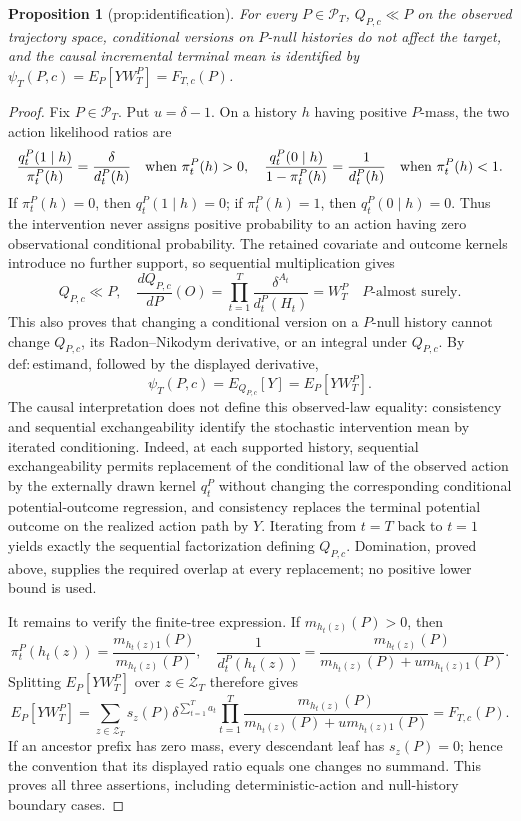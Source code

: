 \documentclass{article}
\newtheorem{proposition}{Proposition}
\begin{document}
\begin{proposition}[prop:identification]\label{prop:identification}
For every \(P\in\mathcal P_T\), \(Q_{P,c}\ll P\) on the observed trajectory space, conditional versions on \(P\)-null histories do not affect the target, and the causal incremental terminal mean is identified by \(\psi_T(P,c)=E_P[YW_T^P]=F_{T,c}(P)\).
\end{proposition}
\begin{proof}
Fix \(P\in\mathcal P_T\).  Put \(u=\delta-1\).  On a history \(h\) having positive \(P\)-mass, the two action likelihood ratios are
\[
 \frac{q_t^P(1\mid h)}{\pi_t^P(h)}=\frac{\delta}{d_t^P(h)}
 \quad\hbox{when }\pi_t^P(h)>0,
 \quad
 \frac{q_t^P(0\mid h)}{1-\pi_t^P(h)}=\frac{1}{d_t^P(h)}
 \quad\hbox{when }\pi_t^P(h)<1.
\]
If \(\pi_t^P(h)=0\), then \(q_t^P(1\mid h)=0\); if \(\pi_t^P(h)=1\), then \(q_t^P(0\mid h)=0\).  Thus the intervention never assigns positive probability to an action having zero observational conditional probability.  The retained covariate and outcome kernels introduce no further support, so sequential multiplication gives
\[
 Q_{P,c}\ll P,
 \quad
 \frac{dQ_{P,c}}{dP}(O)
 =\prod_{t=1}^T\frac{\delta^{A_t}}{d_t^P(H_t)}
 =W_T^P
 \quad P\text{-almost surely}.
\]
This also proves that changing a conditional version on a \(P\)-null history cannot change \(Q_{P,c}\), its Radon--Nikodym derivative, or an integral under \(Q_{P,c}\).  By \(\mathrm{def:estimand}\), followed by the displayed derivative,
\[
 \psi_T(P,c)=E_{Q_{P,c}}[Y]=E_P[YW_T^P].
\]
The causal interpretation does not define this observed-law equality: consistency and sequential exchangeability identify the stochastic intervention mean by iterated conditioning.  Indeed, at each supported history, sequential exchangeability permits replacement of the conditional law of the observed action by the externally drawn kernel \(q_t^P\) without changing the corresponding conditional potential-outcome regression, and consistency replaces the terminal potential outcome on the realized action path by \(Y\).  Iterating from \(t=T\) back to \(t=1\) yields exactly the sequential factorization defining \(Q_{P,c}\).  Domination, proved above, supplies the required overlap at every replacement; no positive lower bound is used.

It remains to verify the finite-tree expression.  If \(m_{h_t(z)}(P)>0\), then
\[
 \pi_t^P(h_t(z))=\frac{m_{h_t(z)1}(P)}{m_{h_t(z)}(P)},
 \quad
 \frac{1}{d_t^P(h_t(z))}
 =\frac{m_{h_t(z)}(P)}{m_{h_t(z)}(P)+u m_{h_t(z)1}(P)}.
\]
Splitting \(E_P[YW_T^P]\) over \(z\in\mathcal Z_T\) therefore gives
\[
 E_P[YW_T^P]
 =\sum_{z\in\mathcal Z_T}s_z(P)\delta^{\sum_{t=1}^T a_t}
   \prod_{t=1}^T
   \frac{m_{h_t(z)}(P)}{m_{h_t(z)}(P)+u m_{h_t(z)1}(P)}
 =F_{T,c}(P).
\]
If an ancestor prefix has zero mass, every descendant leaf has \(s_z(P)=0\); hence the convention that its displayed ratio equals one changes no summand.  This proves all three assertions, including deterministic-action and null-history boundary cases.
\end{proof}
\end{document}
